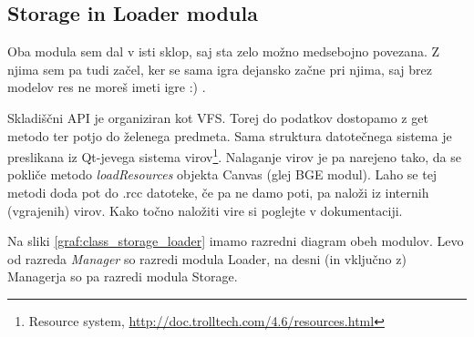\documentclass[a4paper]{article}
\begin{document}
\subsection{Storage in Loader modula}
Oba modula sem dal v isti sklop, saj sta zelo možno medsebojno povezana. Z njima sem pa tudi začel, ker se sama igra dejansko začne pri njima, saj brez modelov res ne moreš imeti igre :) .

Skladiščni API je organiziran kot VFS. Torej do podatkov dostopamo z get metodo ter potjo do želenega predmeta. Sama struktura datotečnega sistema je preslikana iz Qt-jevega sistema virov\footnote{Resource system, \href{http://doc.trolltech.com/4.6/resources.html}{http://doc.trolltech.com/4.6/resources.html}}. Nalaganje virov je pa narejeno tako, da se pokliče metodo \emph{loadResources} objekta Canvas (glej BGE modul). Laho se tej metodi doda pot do .rcc datoteke, če pa ne damo poti, pa naloži iz internih (vgrajenih) virov. Kako točno naložiti vire si poglejte v dokumentaciji.

Na sliki \ref{graf:class_storage_loader} imamo razredni diagram obeh modulov. Levo od razreda \emph{Manager} so razredi modula Loader, na desni (in vključno z) Managerja so pa razredi modula Storage.
\end{document}
